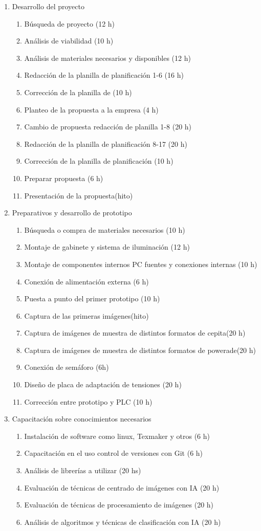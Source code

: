 \documentclass[11pt]{charter}
\begin{document}
\begin{enumerate}
\item Desarrollo del proyecto 
	\begin{enumerate}
	\item Búsqueda de proyecto (12 h)
	\item Análisis de viabilidad (10 h)
	\item Análisis de materiales necesarios y disponibles (12 h)
	\item Redacción de la planilla de planificación 1-6 (16 h)
	\item Corrección de la planilla de  (10 h)
	\item Planteo de la propuesta a la empresa (4 h)
	\item Cambio de propuesta redacción de planilla 1-8 (20 h)
	\item Redacción de la planilla de planificación 8-17 (20 h)
	\item Corrección de la planilla de planificación (10 h)
	\item Preparar propuesta (6 h)
	\item Presentación de la propuesta(hito)
	\end{enumerate}
\item Preparativos y desarrollo de prototipo
\begin{enumerate}
	\item Búsqueda o compra de materiales necesarios (10 h)
	\item Montaje de gabinete y sistema de iluminación (12 h)
	\item Montaje de componentes internos PC fuentes y conexiones internas (10 h)
	\item Conexión de alimentación externa (6 h)
	\item Puesta a punto del primer prototipo (10 h)
	\item Captura de las primeras imágenes(hito)
	\item Captura de imágenes de muestra de distintos formatos de cepita(20 h) 
	\item Captura de imágenes de muestra de distintos formatos de powerade(20 h)
	\item Conexión de semáforo (6h)
	\item Diseño de placa de adaptación de tensiones (20 h)
	\item Corrección entre prototipo y PLC (10 h)
	\end{enumerate}
\item Capacitación sobre conocimientos necesarios
	\begin{enumerate}
	\item Instalación de software como linux, Texmaker y otros (6 h)
	\item Capacitación en el uso control de versiones con Git (6 h)
	\item Análisis de librerías a utilizar (20 hs)
	\item Evaluación de técnicas de centrado de imágenes con IA (20 h) 
	\item Evaluación de técnicas de procesamiento de imágenes (20 h)
	\item Análisis de algoritmos y técnicas de clasificación con IA (20 h)


\end{enumerate}
\end{enumerate}
\end{document}
